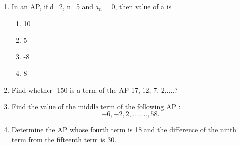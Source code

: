 \begin{enumerate}
    \item In an AP, if d=2, n=5 and $a_n=0$, then value of a is
    \begin{enumerate}
        \item 10
        \item 5
        \item -8
        \item 8
    \end{enumerate}
    \item Find whether -150 is a term of the AP 17, 12, 7, 2,....?
    \item Find the value of the middle term of the following AP :\[- 6, -2, 2,........, 58.\]
   \item Determine the AP whose fourth term is 18 and the difference of the ninth term from the fifteenth term is 30.
\end{enumerate}
